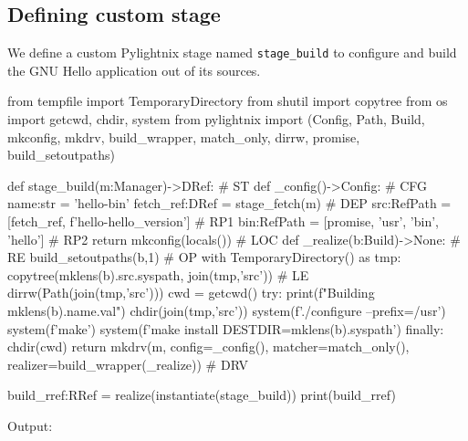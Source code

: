 \pagebreak
\subsection{Defining custom stage}

We define a custom Pylightnix stage named \texttt{stage\_build} to configure
and build the GNU Hello application out of its sources.

\begin{pythontexcode}
from tempfile import TemporaryDirectory
from shutil import copytree
from os import getcwd, chdir, system
from pylightnix import (Config, Path, Build, mkconfig, mkdrv,
  build_wrapper, match_only, dirrw, promise, build_setoutpaths)

def stage_build(m:Manager)->DRef:                            # ST \label{ST}
  def _config()->Config:                                     # CFG \label{CFG}
    name:str = 'hello-bin'
    fetch_ref:DRef = stage_fetch(m)                          # DEP \label{DEP}
    src:RefPath = [fetch_ref, f'hello-{hello_version}']      # RP1 \label{RP1}
    bin:RefPath = [promise, 'usr', 'bin', 'hello']           # RP2 \label{RP2}
    return mkconfig(locals())                                # LOC \label{LOC}
  def _realize(b:Build)->None:                               # RE \label{RE}
    build_setoutpaths(b,1)                                   # OP \label{OP}
    with TemporaryDirectory() as tmp:
      copytree(mklens(b).src.syspath, join(tmp,'src'))       # LE \label{LE}
      dirrw(Path(join(tmp,'src')))
      cwd = getcwd()
      try:
        print(f"Building {mklens(b).name.val}")
        chdir(join(tmp,'src'))
        system(f'./configure --prefix=/usr')
        system(f'make')
        system(f'make install DESTDIR={mklens(b).syspath}')
      finally:
        chdir(cwd)
  return mkdrv(m, config=_config(),
                  matcher=match_only(),
                  realizer=build_wrapper(_realize))          # DRV \label{DRV}

build_rref:RRef = realize(instantiate(stage_build))
print(build_rref)
\end{pythontexcode}

Output:

\mysmallstdout

